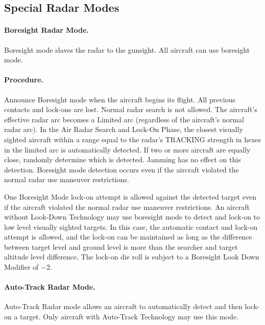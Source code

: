 \subsection{Special Radar Modes}

\paragraph{Boresight Radar Mode.} Boresight mode slaves the radar to the gunsight. All aircraft can use boresight mode. 

\paragraph{Procedure.} Announce Boresight mode when the aircraft begins its flight. All previous contacts and lock-ons are lost. Normal radar search is not allowed. The aircraft's effective radar arc becomes a Limited arc (regardless of the aircraft's normal radar arc). In the Air Radar Search and Lock-On Phase, the closest visually sighted aircraft within a range equal to the radar's TRACKING strength in hexes in the limited arc is automatically detected. If two or more aircraft are equally close, randomly determine which is detected. Jamming has no effect on this detection. Boresight mode detection occurs even if the aircraft violated the normal radar use maneuver restrictions.

One Boresight Mode lock-on attempt is allowed against the detected target even if the aircraft violated the normal radar use maneuver restrictions. An aircraft without Look-Down Technology may use boresight mode to detect and lock-on to low level visually sighted targets. In this case, the automatic contact and lock-on attempt is allowed, and the lock-on can be maintained as long as the difference between target level and ground level is more than the searcher and target altitude level difference. The lock-on die roll is subject to a Boresight Look Down Modifier of $-2$. 

\paragraph{Auto-Track Radar Mode.} Auto-Track Radar mode allows an aircraft to automatically detect and then lock-on a target. Only aircraft with Auto-Track Technology may use this mode.

